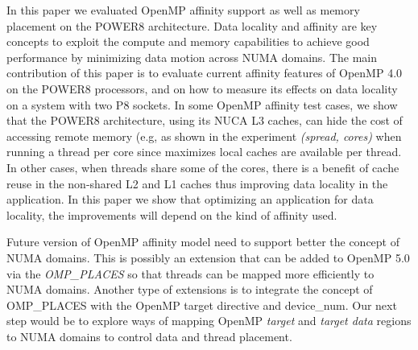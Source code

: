 In this paper we evaluated OpenMP affinity support as well as memory placement on the POWER8 architecture. 
Data locality and affinity are key concepts to exploit the compute and memory capabilities to achieve good performance by minimizing data motion across NUMA domains. 
The main contribution of this paper is to evaluate current affinity features of OpenMP 4.0 on the POWER8 processors, and on how to measure its effects on data locality on a system with two P8 sockets. 
In some OpenMP affinity test cases, we show that the POWER8 architecture, using its NUCA L3 caches, can hide the cost of accessing remote memory (e.g, as shown in the experiment \textit{(spread, cores)} when running a thread per core since maximizes local caches are available per thread. 
In other cases, when threads share some of the cores, there is a benefit of cache reuse in the non-shared L2 and L1 caches thus improving data locality in the application.
 In this paper we show that optimizing an application for data locality, the improvements will depend on the kind of affinity used. 

Future version of OpenMP affinity model need to support better the concept of NUMA domains. 
This is possibly an extension that can be added to OpenMP 5.0 via the \emph{OMP\_PLACES} so that threads can be mapped more efficiently to NUMA domains. Another type of extensions is to integrate the concept of OMP\_PLACES with the OpenMP target directive and device\_num. Our next step would be to explore ways of mapping OpenMP \emph{target} and \emph{target data} 
regions to NUMA domains to control data and thread placement.
